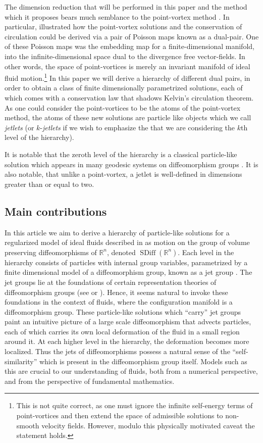 \documentclass[12pt]{amsart}
\newcommand{\R}{\ensuremath{\mathbb{R}}}
\DeclareMathOperator{\SDiff}{SDiff}
\begin{document}
The dimension reduction that will be performed in this paper and the method which it proposes
bears much semblance to the point-vortex method \cite{Chorin1973}.
In particular, \cite{MarsdenWeinstein1983} illustrated how the point-vortex solutions and the conservation of circulation could be derived via a pair of Poisson maps known as a dual-pair.
One of these Poisson maps was the embedding map for a finite-dimensional manifold, into the infinite-dimensional space dual to the divergence free vector-fields.  In other words, the space of point-vortices is merely an invariant manifold of ideal fluid motion.\footnote{This is not quite correct, as one must ignore the infinite self-energy terms of point-vortices and then extend the space of admissible solutions to non-smooth velocity fields.  However, modulo this physically motivated caveat the statement holds.}
In this paper we will derive a hierarchy of different dual pairs, in order to obtain a class of finite dimensionally parametrized solutions,
each of which comes with a conservation law that shadows Kelvin's circulation theorem.
As one could consider the point-vortices to be the atoms of the point-vortex method,
the atoms of these new solutions are particle like objects which we call \emph{jetlets} (or $k$-\emph{jetlets} if we wish to emphasize the that we are considering the $k$th level of the hierarchy).

It is notable that the zeroth level of the hierarchy is a classical particle-like solution which appears in many geodesic
systems on diffeomorphism groups \cite{CamassaHolm1993,JoshiMiller2000,FringerHolm2001,MumfordMichor2013}.
It is also notable, that unlike a point-vortex, a jetlet is well-defined in dimensions greater than or equal to two.
\subsection{Main contributions}
In this article we aim to derive a hierarchy of particle-like
solutions for a regularized model of ideal fluids described in  \cite{MumfordMichor2013} as motion on the group of volume preserving
diffeomorphisms of $\R^n$, denoted $\SDiff(\R^n)$.
Each level in the hierarchy consists of particles
with internal group variables, parametrized by
a finite dimensional model of a diffeomorphism group,
known as a jet group \cite[Chapter 4]{KMS99}.
The jet groups lie at the foundations of certain representation theories of diffeomorphism groups (see \cite[Appendix 2]{VershikGelfandGraev1975} or \cite{Kirillov1981}).
Hence, it seems natural to invoke these foundations in the context of fluids, where the configuration manifold is a diffeomorphism group.
These particle-like solutions which ``carry'' jet groups paint an intuitive picture of a large scale diffeomorphism that advects particles,
each of which carries its own local deformation of the fluid in a small region around it.
At each higher level in the hierarchy, the deformation becomes more localized.
Thus the jets of diffeomorphisms possess a natural sense of the ``self-similarity'' which is present in the diffeomorphism group itself.
 Models such as this are crucial to our understanding of fluids,
  both from a numerical perspective, and from the perspective
  of fundamental mathematics.
\end{document}
